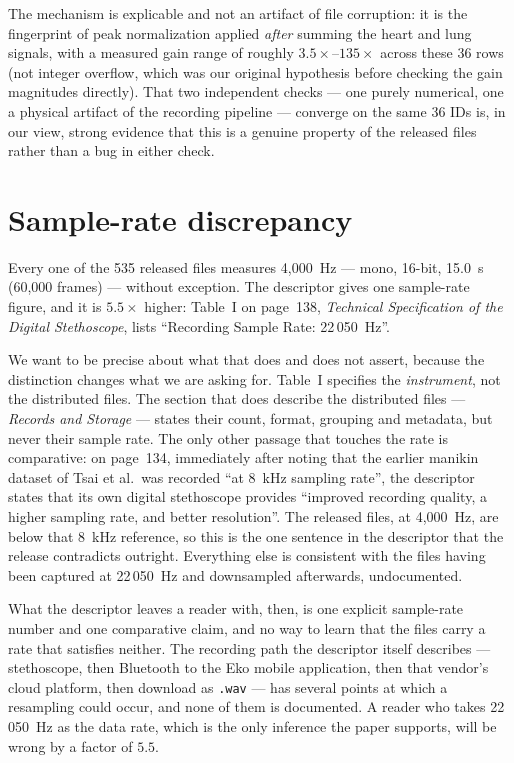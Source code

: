 \documentclass[11pt]{article}
\begin{document}
The mechanism is explicable and not an artifact of file corruption: it is
the fingerprint of peak normalization applied \emph{after} summing the
heart and lung signals, with a measured gain range of roughly
$3.5\times$--$135\times$ across these 36 rows (not integer overflow, which
was our original hypothesis before checking the gain magnitudes directly).
That two independent checks --- one purely numerical, one a physical
artifact of the recording pipeline --- converge on the same 36 IDs is, in
our view, strong evidence that this is a genuine property of the released
files rather than a bug in either check.

\section{Sample-rate discrepancy}
\label{sec:samplerate}

Every one of the 535 released files measures 4{,}000~Hz --- mono, 16-bit,
15.0~s (60{,}000 frames) --- without exception. The descriptor gives one
sample-rate figure, and it is $5.5\times$ higher: Table~I on page~138,
\emph{Technical Specification of the Digital Stethoscope}, lists
``Recording Sample Rate: 22\,050~Hz''.

We want to be precise about what that does and does not assert, because the
distinction changes what we are asking for. Table~I specifies the
\emph{instrument}, not the distributed files. The section that does describe
the distributed files --- \emph{Records and Storage} --- states their count,
format, grouping and metadata, but never their sample rate. The only other
passage that touches the rate is comparative: on page~134, immediately after
noting that the earlier manikin dataset of Tsai et al.\ was recorded ``at
8~kHz sampling rate'', the descriptor states that its own digital
stethoscope provides ``improved recording quality, a higher sampling rate,
and better resolution''. The released files, at 4{,}000~Hz, are below that
8~kHz reference, so this is the one sentence in the descriptor that the
release contradicts outright. Everything else is consistent with the files
having been captured at 22\,050~Hz and downsampled afterwards, undocumented.

What the descriptor leaves a reader with, then, is one explicit sample-rate
number and one comparative claim, and no way to learn that the files carry a
rate that satisfies neither. The recording path the
descriptor itself describes --- stethoscope, then Bluetooth to the Eko
mobile application, then that vendor's cloud platform, then download as
\texttt{.wav} --- has several points at which a resampling could occur, and
none of them is documented. A reader who takes 22\,050~Hz as the data rate,
which is the only inference the paper supports, will be wrong by a factor of
$5.5$.
\end{document}
